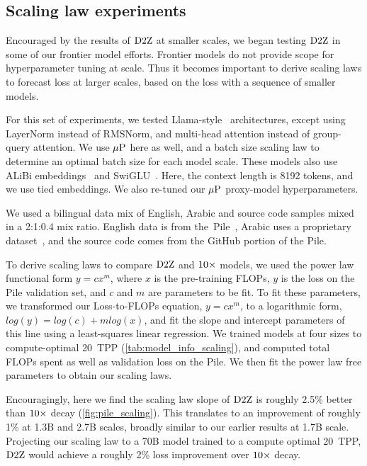 \subsection{Scaling law experiments}\label{subsec:scaling}


Encouraged by the results of $\mbox{D2Z}$ at smaller scales, we began
testing $\mbox{D2Z}$ in some of our frontier model efforts.  Frontier
models do not provide scope for hyperparameter tuning at scale.  Thus
it becomes important to derive scaling laws to forecast loss at larger
scales, based on the loss with a sequence of smaller models.

For this set of experiments, we tested
Llama-style~\citep{touvron2023llama} architectures, except using
LayerNorm instead of RMSNorm, and multi-head attention instead of
group-query attention.  We use $\mbox{$\mu$P}$ here as well, and a batch size
scaling law to determine an optimal batch size for each model scale.
%
These models also use ALiBi embeddings~\citep{press2022alibi} and
SwiGLU~\citep{shazeer2020glu}.  Here, the context length is 8192
tokens, and we use tied embeddings.
%
We also re-tuned our $\mbox{$\mu$P}$ proxy-model hyperparameters.

We used a bilingual data mix of English, Arabic and source code
samples mixed in a 2:1:0.4 mix ratio. English data is from
the~Pile~\citep{gao2020pile}, Arabic uses a proprietary
dataset~\citep{sengupta2023jais}, and the source code comes from the
GitHub portion of the Pile.



To derive scaling laws to compare $\mbox{D2Z}$ and $\mbox{10}\times$ models, we used
the power law functional form $y = c x^m$, where $x$ is the
pre-training FLOPs, $y$ is the loss on the Pile validation set, and
$c$ and $m$ are parameters to be fit.
%
To fit these parameters, we transformed our Loss-to-FLOPs equation, $y
= c x^m$, to a logarithmic form, $log(y)=log(c)+m log(x)$, and fit the
slope and intercept parameters of this line using a least-squares
linear regression.
%
We trained models at four sizes to compute-optimal 20~TPP
(\cref{tab:model_info_scaling}), and computed total FLOPs spent
as well as validation loss on the Pile.
%
We then fit the power law free parameters to obtain our scaling laws.



Encouragingly, here we find the scaling law slope of $\mbox{D2Z}$ is
roughly 2.5\% better than $\mbox{10}\times$ decay
(\cref{fig:pile_scaling}).
%
This translates to an improvement of roughly 1\% at 1.3B and 2.7B
scales, broadly similar to our earlier results at 1.7B scale.
%
Projecting our scaling law to a 70B model trained to a compute optimal
20~TPP, $\mbox{D2Z}$ would achieve a roughly 2\% loss improvement over
$\mbox{10}\times$ decay.

